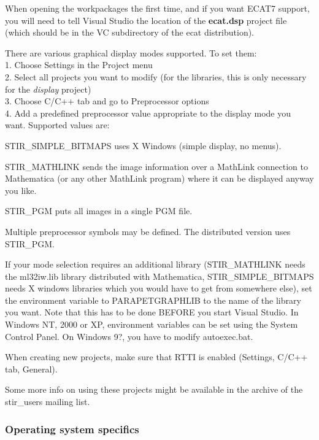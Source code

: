\documentclass{article}
\newcommand{\tab}{\hspace{5mm}}
\begin{document}
When opening the workpackages the first time, and if you want
ECAT7 support, you will need to tell Visual 
Studio the location of the \textbf{ecat.dsp} project file (which should 
be in the VC subdirectory of the ecat distribution).


There are various graphical display modes supported. To set them:\\
1.\tab 
Choose Settings in the Project menu\\
2.\tab 
Select all projects you want to modify (for the libraries, this 
is only necessary for the \textit{display} project)\\
3.\tab 
Choose C/C++ tab and go to Preprocessor options\\
4.\tab 
Add a predefined preprocessor value appropriate to the display 
mode you want. Supported values are: 


STIR\_SIMPLE\_BITMAPS uses X Windows (simple display, no menus).


STIR\_MATHLINK sends the image information over a MathLink connection 
to Mathematica (or any other MathLink program) where it can be 
displayed anyway you like.


STIR\_PGM puts all images in a single PGM file.


Multiple preprocessor symbols may be defined. The distributed 
version uses STIR\_PGM.


If your mode selection requires an additional library (STIR\_MATHLINK 
needs the ml32iw.lib library distributed with Mathematica, STIR\_SIMPLE\_BITMAPS 
needs X windows libraries which you would have to get from somewhere 
else), set the environment variable to PARAPETGRAPHLIB to the 
name of the library you want. Note that this has to be done BEFORE 
you start Visual Studio. In Windows NT, 2000 or XP, environment 
variables can be set using the System Control Panel. On Windows 
9?, you have to modify autoexec.bat. 



When creating new projects, make sure that RTTI is enabled (Settings, 
C/C++ tab, General). 



Some more info on using these projects might be available in 
the archive of the stir\_users mailing list.


\subsubsection{
Operating system specifics}

{ 
}
\end{document}
